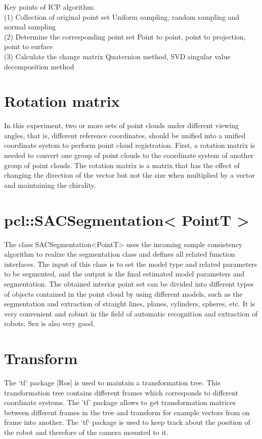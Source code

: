 Key points of ICP algorithm:\\
(1) Collection of original point set Uniform sampling, random sampling and normal sampling\\
(2) Determine the corresponding point set Point to point, point to projection, point to surface\\
(3) Calculate the change matrix Quaternion method, SVD singular value decomposition method\\

\section{Rotation matrix}
In this experiment, two or more sets of point clouds under different viewing angles, that is, different reference coordinates, should be unified into a unified coordinate system to perform point cloud registration. First, a rotation matrix is needed to convert one group of point clouds to the coordinate system of another group of point clouds. The rotation matrix is a matrix that has the effect of changing the direction of the vector but not the size when multiplied by a vector and maintaining the chirality.
\section{pcl::SACSegmentation< PointT >}
The class SACSegmentation<PointT> uses the incoming sample consistency algorithm to realize the segmentation class and defines all related function interfaces. The input of this class is to set the model type and related parameters to be segmented, and the output is the final estimated model parameters and segmentation. The obtained interior point set can be divided into different types of objects contained in the point cloud by using different models, such as the segmentation and extraction of straight lines, planes, cylinders, spheres, etc. It is very convenient and robust in the field of automatic recognition and extraction of robots. Sex is also very good.
\section{Transform}
The ‘tf‘ package [Ros] is used to maintain a transformation tree. This transformation
tree contains different frames which corresponds to different coordinate systems. The
’tf’ package allows to get transformation matrices between different frames in the
tree and transform for example vectors from on frame into another. The ‘tf‘ package
is used to keep track about the position of the robot and therefore of the camera
mounted to it.
